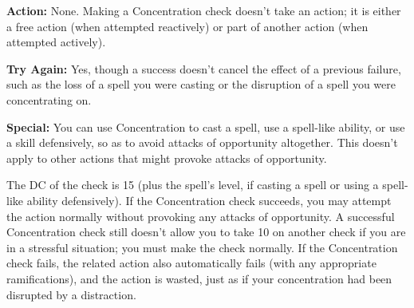 \textbf{Action:} None. Making a Concentration check doesn't take an action; it is either a free action (when attempted reactively) or part of another action (when attempted actively).

\textbf{Try Again:} Yes, though a success doesn't cancel the effect of a previous failure, such as the loss of a spell you were casting or the disruption of a spell you were concentrating on.

\textbf{Special:} You can use Concentration to cast a spell, use a spell-like ability, or use a skill defensively, so as to avoid attacks of opportunity altogether. This doesn't apply to other actions that might provoke attacks of opportunity.

The DC of the check is 15 (plus the spell's level, if casting a spell or using a spell-like ability defensively). If the Concentration check succeeds, you may attempt the action normally without provoking any attacks of opportunity. A successful Concentration check still doesn't allow you to take 10 on another check if you are in a stressful situation; you must make the check normally. If the Concentration check fails, the related action also automatically fails (with any appropriate ramifications), and the action is wasted, just as if your concentration had been disrupted by a distraction. 
